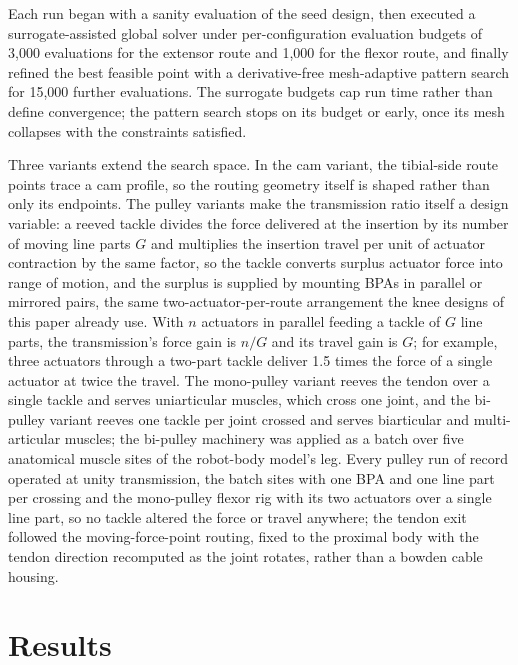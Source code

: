 \documentclass[utf8]{FrontiersinHarvard} %
\begin{document}
Each run began with a sanity evaluation of the seed design, then executed a surrogate-assisted global solver under per-configuration evaluation budgets of 3,000 evaluations for the extensor route and 1,000 for the flexor route, and finally refined the best feasible point with a derivative-free mesh-adaptive pattern search for 15,000 further evaluations. The surrogate budgets cap run time rather than define convergence; the pattern search stops on its budget or early, once its mesh collapses with the constraints satisfied.

Three variants extend the search space. In the cam variant, the tibial-side route points trace a cam profile, so the routing geometry itself is shaped rather than only its endpoints. The pulley variants make the transmission ratio itself a design variable: a reeved tackle divides the force delivered at the insertion by its number of moving line parts $G$ and multiplies the insertion travel per unit of actuator contraction by the same factor, so the tackle converts surplus actuator force into range of motion, and the surplus is supplied by mounting BPAs in parallel or mirrored pairs, the same two-actuator-per-route arrangement the knee designs of this paper already use. With $n$ actuators in parallel feeding a tackle of $G$ line parts, the transmission's force gain is $n/G$ and its travel gain is $G$; for example, three actuators through a two-part tackle deliver 1.5 times the force of a single actuator at twice the travel. The mono-pulley variant reeves the tendon over a single tackle and serves uniarticular muscles, which cross one joint, and the bi-pulley variant reeves one tackle per joint crossed and serves biarticular and multi-articular muscles; the bi-pulley machinery was applied as a batch over five anatomical muscle sites of the robot-body model's leg. Every pulley run of record operated at unity transmission, the batch sites with one BPA and one line part per crossing and the mono-pulley flexor rig with its two actuators over a single line part, so no tackle altered the force or travel anywhere; the tendon exit followed the moving-force-point routing, fixed to the proximal body with the tendon direction recomputed as the joint rotates, rather than a bowden cable housing.


\section{Results}\label{sec:results_torque}
\end{document}
